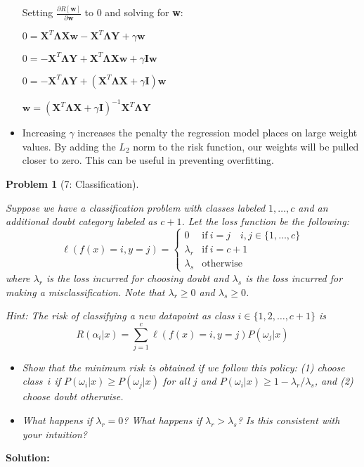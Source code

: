\documentclass[11pt]{exam}
\theoremstyle{quest}
\newtheorem*{question}{Problem}
\begin{document}
\begin{itemize}
Setting $\frac{\partial R[\textbf{w}]}{\partial \textbf{w}}$ to 0 and solving for \textbf{w}:

$
0 = \textbf{X}^T\boldsymbol{\Lambda}\textbf{X}\textbf{w} - \textbf{X}^T\boldsymbol{\Lambda}\textbf{Y} + \gamma\textbf{w}
$

$
0 = - \textbf{X}^T\boldsymbol{\Lambda}\textbf{Y} + \textbf{X}^T\boldsymbol{\Lambda}\textbf{X}\textbf{w} + \gamma\textbf{I}\textbf{w}
$

$
0 = - \textbf{X}^T\boldsymbol{\Lambda}\textbf{Y} + (\textbf{X}^T\boldsymbol{\Lambda}\textbf{X} + \gamma\textbf{I})\textbf{w}
$

$
\textbf{w} = (\textbf{X}^T\boldsymbol{\Lambda}\textbf{X} + \gamma\textbf{I})^{-1}\textbf{X}^T\boldsymbol{\Lambda}\textbf{Y}
$

\item[(d)]
Increasing $\gamma$ increases the penalty the regression model places on large weight values. By adding the $L_2$ norm to the risk function, our weights will be pulled closer to zero. This can be useful in preventing overfitting. 

\end{itemize}

\newpage


\begin{question}[7: Classification]
~

Suppose we have a classification problem with classes labeled $1, \dotsc, c$ and
an additional doubt category labeled as $c+1$. Let the loss function be the
following:\\
\[
\ell(f(x) = i, y = j) =
  \begin{cases}
   0 &  \mathrm{if}\ i=j \quad i,j\in\{1,\dotsc,c\} \\
   \lambda_r       & \mathrm{if}\ i=c+1 \\
   \lambda_s       & \text{otherwise}
  \end{cases}
\]
where $\lambda_r$ is the loss incurred for choosing doubt and $\lambda_s$ is the
loss incurred for making a misclassification. Note that $\lambda_r \ge 0$ and
$\lambda_s \ge 0$.

Hint: The risk of classifying a new datapoint as class $i\in\{1,2,\dots,c+1\}$
is $$R(\alpha_i|x) = \sum_{j=1}^{c} \ell(f(x) = i, y = j) P(\omega_j|x)$$

\begin{itemize}
\item[(a)] Show that the minimum risk is obtained if we follow this policy: (1)
  choose class~$i$ if $P(\omega_i|x) \geq P(\omega_j|x)$ for all $j$ and
  $P(\omega_i|x) \geq 1-\lambda_r/\lambda_s$, and (2) choose doubt otherwise.
\item[(b)] What happens if $\lambda_r=0$? What happens if $\lambda_r>\lambda_s$? Is this consistent with your intuition?
\end{itemize}
\end{question}
\textbf{Solution:}
\end{document}
